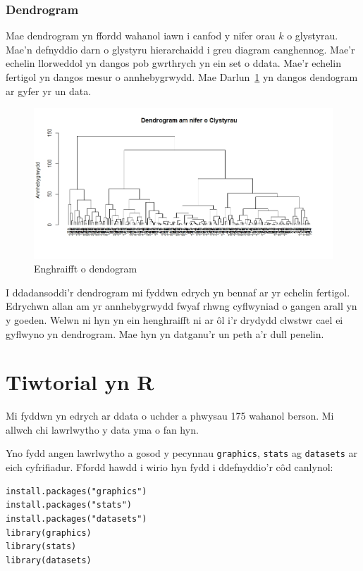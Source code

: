 \subsubsection{Dendrogram}

Mae dendrogram yn ffordd wahanol iawn i canfod y nifer orau $k$ o glystyrau. Mae'n defnyddio darn o glystyru hierarchaidd i greu diagram canghennog. Mae'r echelin llorweddol yn dangos pob gwrthrych yn ein set o ddata. Mae'r echelin fertigol yn dangos mesur o annhebygrwydd. Mae Darlun~\ref{fig:dendogram} yn dangos dendogram ar gyfer yr un data.

\begin{figure}[H]
\begin{center}
\includegraphics[width=0.5\linewidth]{../img/Dendrogram.jpeg}
\end{center}
\caption{Enghraifft o dendogram}
\label{fig:dendogram}
\end{figure}

I ddadansoddi'r dendrogram mi fyddwn edrych yn bennaf ar yr echelin fertigol. Edrychwn allan am yr annhebygrwydd fwyaf rhwng cyflwyniad o gangen arall yn y goeden. Welwn ni hyn yn ein henghraifft ni ar ôl i'r drydydd clwstwr cael ei gyflwyno yn dendrogram. Mae hyn yn datganu'r un peth a'r dull penelin.

\section{Tiwtorial yn R}
Mi fyddwn yn edrych ar ddata o uchder a phwysau 175 wahanol berson. Mi allwch chi lawrlwytho y data yma o fan hyn. %

Yno fydd angen lawrlwytho a gosod y pecynnau \texttt{graphics}, \texttt{stats} ag \texttt{datasets} ar eich cyfrifiadur. Ffordd hawdd i wirio hyn fydd i ddefnyddio'r c\^{o}d canlynol: 

\begin{verbatim}
install.packages("graphics")
install.packages("stats")
install.packages("datasets")
library(graphics)
library(stats)
library(datasets)
\end{verbatim}

